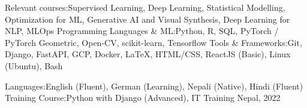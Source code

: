 	


\begin{talks}
    \award
    {Relevant courses:}{}{}{Supervised Learning, Deep Learning, Statistical Modelling, Optimization for ML, Generative AI and Visual Synthesis, Deep Learning for NLP, MLOps}
    \award
    {Programming Languages \& ML:}{}{}{Python, R, SQL, PyTorch  / PyTorch Geometric, Open-CV, scikit-learn, Tensorflow  }
    \award
    {Tools \& Frameworks:}{}{}{Git, Django, FastAPI, GCP, Docker, LaTeX, HTML/CSS, ReactJS (Basic), Linux (Ubuntu), Bash}

\end{talks}    
\vspace{-3mm}


\begin{talks}
    \award
    {Languages:}{}{}{English (Fluent), German (Learning), Nepali (Native), Hindi (Fluent)}
    \award
    {Training Course:}{}{}{Python with Django (Advanced), IT Training Nepal, 2022}
\end{talks}    
\vspace{-3mm}




